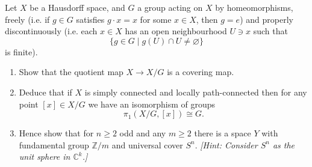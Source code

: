 \begin{problem}
Let \(X\) be a Hausdorff space, and \(G\) a group acting on \(X\) by homeomorphisms, freely (i.e. if \(g\in G\) satisfies \(g\cdot x=x\) for some \(x\in X\), then \(g=e\)) and properly discontinuously (i.e. each \(x\in X\) has an open neighbourhood \(U\ni x\) such that
\[
\{g\in G\mid g(U)\cap U\neq \varnothing\}
\]
is finite).

\begin{enumerate}
	\item[(i)] Show that the quotient map \(X\to X/G\) is a covering map.
	\item[(ii)] Deduce that if \(X\) is simply connected and locally path-connected then for any point \([x]\in X/G\) we have an isomorphism of groups
	\[
	\pi_1(X/G,[x])\cong G.
	\]
	\item[(iii)] Hence show that for \(n\ge 2\) odd and any \(m\ge 2\) there is a space \(Y\) with fundamental group \(\mathbb{Z}/m\) and universal cover \(S^n\). \emph{[Hint: Consider \(S^n\) as the unit sphere in \(\mathbb{C}^k\).]}
\end{enumerate}
\end{problem}

